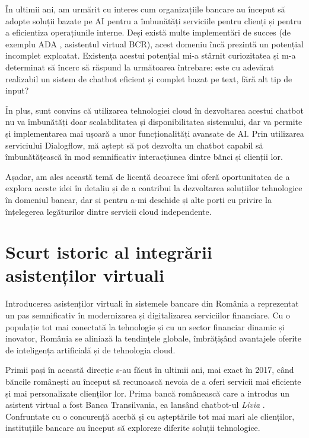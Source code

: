 În ultimii ani, am urmărit cu interes cum organizațiile bancare au început să adopte soluții bazate pe AI pentru a îmbunătăți serviciile pentru clienți și pentru a eficientiza operațiunile interne. Deși există multe implementări de succes (de exemplu ADA \cite{ADA}, asistentul virtual BCR), acest domeniu încă prezintă un potențial incomplet exploatat. Existența acestui potențial mi-a stârnit curiozitatea și m-a determinat să încerc să răspund la următoarea întrebare: este cu adevărat realizabil un sistem de chatbot eficient și complet bazat pe text, fără alt tip de input?

În plus, sunt convins că utilizarea tehnologiei cloud în dezvoltarea acestui chatbot nu va îmbunătăți doar scalabilitatea și disponibilitatea sistemului, dar va permite și implementarea mai ușoară a unor funcționalități avansate de AI. Prin utilizarea serviciului Dialogflow, mă aștept să pot dezvolta un chatbot capabil să îmbunătățească în mod semnificativ interacțiunea dintre bănci și clienții lor.

Așadar, am ales această temă de licență deoarece îmi oferă oportunitatea de a explora aceste idei în detaliu și de a contribui la dezvoltarea soluțiilor tehnologice în domeniul bancar, dar și pentru a-mi deschide și alte porți cu privire la înțelegerea legăturilor dintre servicii cloud independente.

\section{Scurt istoric al integrării asistenților virtuali}

Introducerea asistenților virtuali în sistemele bancare din România a reprezentat un pas semnificativ în modernizarea și digitalizarea serviciilor financiare. Cu o populație tot mai conectată la tehnologie și cu un sector financiar dinamic și inovator, România se aliniază la tendințele globale, îmbrățișând avantajele oferite de inteligența artificială și de tehnologia cloud.

Primii pași în această direcție s-au făcut în ultimii ani, mai exact în 2017, când băncile românești au început să recunoască nevoia de a oferi servicii mai eficiente și mai personalizate clienților lor. Prima bancă românească care a introdus un asistent virtual a fost Banca Transilvania, ea lansând chatbot-ul \emph{Livia} \cite{first-chatbot}. Confruntate cu o concurență acerbă și cu așteptările tot mai mari ale clienților, instituțiile bancare au început să exploreze diferite soluții tehnologice. 

